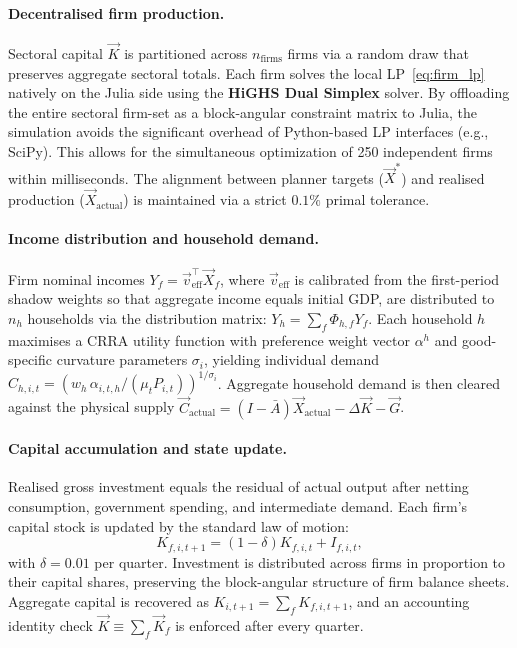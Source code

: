 \paragraph{Decentralised firm production.}
Sectoral capital $\vec{K}$ is partitioned across $n_{\text{firms}}$ firms
via a random draw that preserves aggregate sectoral totals.
Each firm solves the local LP~\eqref{eq:firm_lp} natively on the Julia side
using the \textbf{HiGHS Dual Simplex} solver.
By offloading the entire sectoral firm-set as a block-angular constraint
matrix to Julia, the simulation avoids the significant overhead of
Python-based LP interfaces (e.g., SciPy).
This allows for the simultaneous optimization of 250 independent firms
within milliseconds.
The alignment between planner targets ($\vec{X}^*$) and realised
production ($\vec{X}_{\text{actual}}$) is maintained via a
strict $0.1\%$ primal tolerance.

\paragraph{Income distribution and household demand.}
Firm nominal incomes $Y_f = \vec{v}_{\text{eff}}^\top \vec{X}_f$, where
$\vec{v}_{\text{eff}}$ is calibrated from the first-period shadow weights
so that aggregate income equals initial GDP, are distributed to
$n_h$ households via the distribution matrix:
$Y_h = \sum_f \Phi_{h,f} Y_f$.
Each household $h$ maximises a CRRA utility function with preference
weight vector $\alpha^h$ and good-specific curvature parameters
$\sigma_i$, yielding individual demand
$C_{h,i,t} = (w_h\,\alpha_{i,t,h}/(\mu_t P_{i,t}))^{1/\sigma_i}$.
Aggregate household demand is then cleared against the
physical supply $\vec{C}_{\text{actual}} = (I{-}\bar{A})\vec{X}_{\text{actual}}
- \Delta\vec{K} - \vec{G}$.

\paragraph{Capital accumulation and state update.}
Realised gross investment equals the residual of actual output after
netting consumption, government spending, and intermediate demand.
Each firm's capital stock is updated by the standard law of motion:
\begin{equation}
  K_{f,i,t+1} = (1 - \delta) K_{f,i,t} + I_{f,i,t},
\end{equation}
with $\delta = 0.01$ per quarter.
Investment is distributed across firms in proportion to their capital
shares, preserving the block-angular structure of firm balance sheets.
Aggregate capital is recovered as $K_{i,t+1} = \sum_f K_{f,i,t+1}$,
and an accounting identity check $\vec{K} \equiv \sum_f \vec{K}_f$
is enforced after every quarter.

